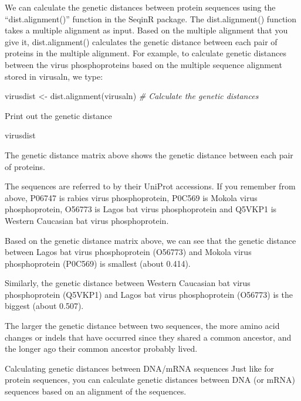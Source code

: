 \documentclass[
]{book}
\newenvironment{Shaded}{\begin{snugshade}}{\end{snugshade}}
\newcommand{\CommentTok}[1]{\textcolor[rgb]{0.56,0.35,0.01}{\textit{#1}}}
\newcommand{\FunctionTok}[1]{\textcolor[rgb]{0.00,0.00,0.00}{#1}}
\newcommand{\NormalTok}[1]{#1}
\newcommand{\OtherTok}[1]{\textcolor[rgb]{0.56,0.35,0.01}{#1}}
\begin{document}
We can calculate the genetic distances between protein sequences using the ``dist.alignment()'' function in the SeqinR package. The dist.alignment() function takes a multiple alignment as input. Based on the multiple alignment that you give it, dist.alignment() calculates the genetic distance between each pair of proteins in the multiple alignment. For example, to calculate genetic distances between the virus phosphoproteins based on the multiple sequence alignment stored in virusaln, we type:

\begin{Shaded}
\begin{Highlighting}[]
\NormalTok{virusdist }\OtherTok{\textless{}{-}} \FunctionTok{dist.alignment}\NormalTok{(virusaln)                 }\CommentTok{\# Calculate the genetic distances}
\end{Highlighting}
\end{Shaded}

Print out the genetic distance

\begin{Shaded}
\begin{Highlighting}[]
\NormalTok{virusdist}
\end{Highlighting}
\end{Shaded}

The genetic distance matrix above shows the genetic distance between each pair of proteins.

The sequences are referred to by their UniProt accessions. If you remember from above, P06747 is rabies virus phosphoprotein, P0C569 is Mokola virus phosphoprotein, O56773 is Lagos bat virus phosphoprotein and Q5VKP1 is Western Caucasian bat virus phosphoprotein.

Based on the genetic distance matrix above, we can see that the genetic distance between Lagos bat virus phosphoprotein (O56773) and Mokola virus phosphoprotein (P0C569) is smallest (about 0.414).

Similarly, the genetic distance between Western Caucasian bat virus phosphoprotein (Q5VKP1) and Lagos bat virus phosphoprotein (O56773) is the biggest (about 0.507).

The larger the genetic distance between two sequences, the more amino acid changes or indels that have occurred since they shared a common ancestor, and the longer ago their common ancestor probably lived.

Calculating genetic distances between DNA/mRNA sequences
Just like for protein sequences, you can calculate genetic distances between DNA (or mRNA) sequences based on an alignment of the sequences.
\end{document}
